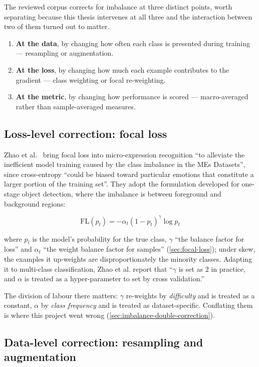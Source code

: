The reviewed corpus corrects for imbalance at three distinct points, worth separating because this thesis intervenes at all three and the interaction between two of them turned out to matter.

\begin{enumerate}
	\item \textbf{At the data}, by changing how often each class is presented during training --- resampling or augmentation.
	\item \textbf{At the loss}, by changing how much each example contributes to the gradient --- class weighting or focal re-weighting.
	\item \textbf{At the metric}, by changing how performance is scored --- macro-averaged rather than sample-averaged measures.
\end{enumerate}

\subsection{Loss-level correction: focal loss}
\label{sec:imbalance-focal}

Zhao et al.~\cite{zhaoS2021} bring focal loss into micro-expression recognition ``to alleviate the inefficient model training caused by the class imbalance in the MEs Datasets'', since cross-entropy ``could be biased toward particular emotions that constitute a larger portion of the training set''. They adopt the formulation developed for one-stage object detection, where the imbalance is between foreground and background regions:

\[
	\text{FL}(p_t) = -\alpha_t (1 - p_t)^{\gamma}\log p_t
\]

where $p_t$ is the model's probability for the true class, $\gamma$ ``the balance factor for loss'' and $\alpha_t$ ``the weight balance factor for samples'' (\autoref{sec:focal-loss}); under skew, the examples it up-weights are disproportionately the minority classes. Adapting it to multi-class classification, Zhao et al. report that ``$\gamma$ is set as 2 in practice, and $\alpha$ is treated as a hyper-parameter to set by cross validation.''

The division of labour there matters: $\gamma$ re-weights by \textit{difficulty} and is treated as a constant, $\alpha$ by \textit{class frequency} and is treated as dataset-specific. Conflating them is where this project went wrong (\autoref{sec:imbalance-double-correction}).

\subsection{Data-level correction: resampling and augmentation}
\label{sec:imbalance-balanced-loss}

